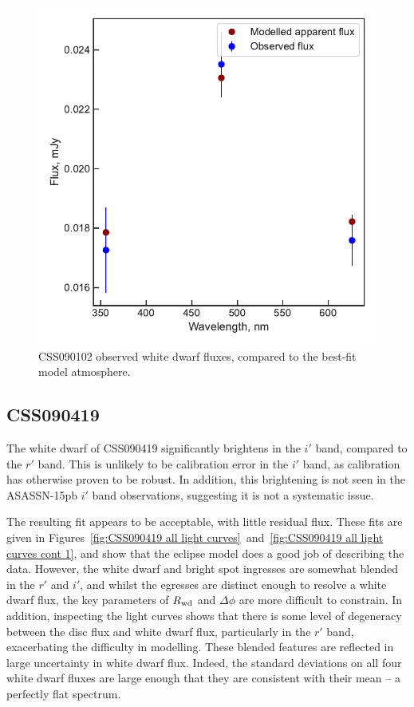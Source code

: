 \begin{figure}
    \centering
    \includegraphics[width=\textwidth]{figures/results/CSS090102/fluxplot.pdf}
    \caption{CSS090102 observed white dwarf fluxes, compared to the best-fit model atmosphere.}
    \label{fig:CSS090102 flux plot}
\end{figure}
\clearpage




\newpage
\subsection{CSS090419}

The white dwarf of CSS090419 significantly brightens in the $i'$ band, compared to the $r'$ band. This is unlikely to be calibration error in the $i'$ band, as calibration has otherwise proven to be robust. In addition, this brightening is not seen in the ASASSN-15pb $i'$ band observations, suggesting it is not a systematic issue.

The resulting fit appears to be acceptable, with little residual flux. These fits are given in Figures~\ref{fig:CSS090419 all light curves}~and~\ref{fig:CSS090419 all light curves cont 1}, and show that the eclipse model does a good job of describing the data.
However, the white dwarf and bright spot ingresses are somewhat blended in the $r'$ and $i'$, and whilst the egresses are distinct enough to resolve a white dwarf flux, the key parameters of $R_{\rm wd}$ and $\Delta \phi$ are more difficult to constrain.
In addition, inspecting the light curves shows that there is some level of degeneracy between the disc flux and white dwarf flux, particularly in the $r'$ band, exacerbating the difficulty in modelling.
These blended features are reflected in large uncertainty in white dwarf flux. Indeed, the standard deviations on all four white dwarf fluxes are large enough that they are consistent with their mean -- a perfectly flat spectrum.

